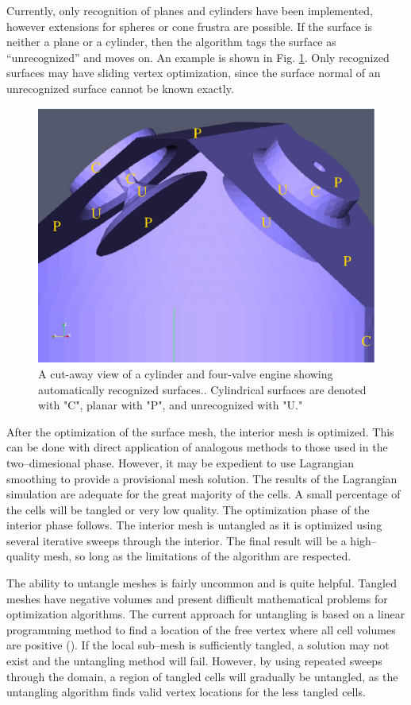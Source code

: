 \documentclass[a4paper,12pt,notitlepage]{article}
\begin{document}
Currently, only
recognition of planes and cylinders have been implemented, however
extensions for spheres or cone frustra are possible.  If the surface
is neither a plane or a cylinder, then the algorithm tags the surface
as ``unrecognized'' and moves on.  An example is shown in Fig. \ref{fig:Surfaces}.  Only recognized surfaces may have
sliding vertex optimization, since the surface normal of an
unrecognized surface cannot be known exactly.
 
\begin{figure}
	\centering
	\includegraphics[height=0.4\textwidth]{Images/surfaces.eps}
	\caption{A cut-away view of a cylinder and four-valve engine showing automatically recognized surfaces..  Cylindrical surfaces are denoted with "C", planar with "P", and unrecognized with "U."}
	\label{fig:Surfaces}
\end{figure}

After the optimization of the surface mesh, the interior mesh is
optimized.  This can be done with direct application of analogous
methods to those used in the two--dimesional phase.  However, it may be
expedient to use Lagrangian smoothing to provide a provisional mesh
solution.  The results of the Lagrangian simulation are adequate for
the great majority of the cells.  A small percentage of the cells will
be tangled or very low quality.  The optimization phase of the
interior phase follows.  The interior mesh is untangled as it is
optimized using several iterative sweeps through the interior.  The
final result will be a high--quality mesh, so long as the limitations
of the algorithm are respected.

The ability to untangle meshes is fairly uncommon and is quite
helpful.  Tangled meshes have negative volumes and present difficult
mathematical problems for optimization algorithms.  The current
approach for untangling is based on a linear programming method to
find a location of the free vertex where all cell volumes are positive
(\cite{optms:manual}).  If the local sub--mesh is sufficiently tangled, a
solution may not exist and the untangling method will fail.  However,
by using repeated sweeps through the domain, a region of tangled cells
will gradually be untangled, as the untangling algorithm finds valid
vertex locations for the less tangled cells.
\end{document}
